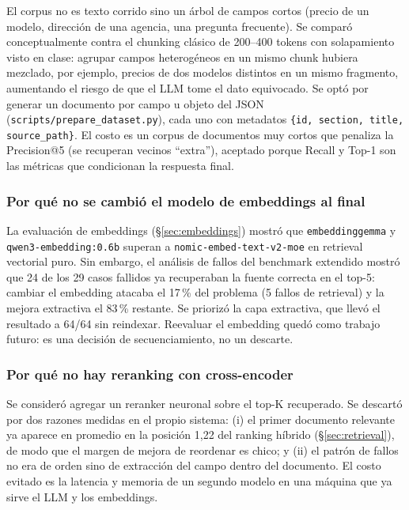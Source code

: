 \documentclass[11pt,a4paper]{article}
\newcommand{\code}[1]{\texttt{#1}}
\begin{document}
El corpus no es texto corrido sino un árbol de campos cortos (precio de un
modelo, dirección de una agencia, una pregunta frecuente). Se comparó
conceptualmente contra el chunking clásico de 200--400 tokens con
solapamiento visto en clase: agrupar campos heterogéneos en un mismo chunk
hubiera mezclado, por ejemplo, precios de dos modelos distintos en un mismo
fragmento, aumentando el riesgo de que el LLM tome el dato equivocado. Se
optó por generar un documento por campo u objeto del JSON
(\code{scripts/prepare\_dataset.py}), cada uno con metadatos
\code{\{id, section, title, source\_path\}}. El costo es un corpus de
documentos muy cortos que penaliza la Precision@5 (se recuperan vecinos
``extra''), aceptado porque Recall y Top-1 son las métricas que condicionan
la respuesta final.

\subsubsection{Por qué no se cambió el modelo de embeddings al final}\label{sec:noembed}

La evaluación de embeddings (§\ref{sec:embeddings}) mostró que
\code{embeddinggemma} y \code{qwen3-embedding:0.6b} superan a
\code{nomic-embed-text-v2-moe} en retrieval vectorial puro. Sin embargo, el
análisis de fallos del benchmark extendido mostró que 24 de los 29 casos
fallidos ya recuperaban la fuente correcta en el top-5: cambiar el embedding
atacaba el 17\,\% del problema (5 fallos de retrieval) y la mejora extractiva
el 83\,\% restante. Se priorizó la capa extractiva, que llevó el resultado a
64/64 sin reindexar. Reevaluar el embedding quedó como trabajo futuro: es una
decisión de secuenciamiento, no un descarte.

\subsubsection{Por qué no hay reranking con cross-encoder}

Se consideró agregar un reranker neuronal sobre el top-K recuperado. Se
descartó por dos razones medidas en el propio sistema: (i) el primer
documento relevante ya aparece en promedio en la posición 1{,}22 del ranking
híbrido (§\ref{sec:retrieval}), de modo que el margen de mejora de
reordenar es chico; y (ii) el patrón de fallos no era de orden sino de
extracción del campo dentro del documento. El costo evitado es la latencia y
memoria de un segundo modelo en una máquina que ya sirve el LLM y los
embeddings.
\end{document}
